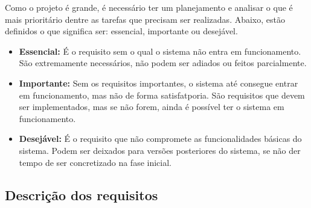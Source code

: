 \documentclass[12pt,a4paper]{report}
\begin{document}
Como o projeto é grande, é necessário ter um planejamento e analisar o que é mais prioritário dentre as tarefas que precisam ser realizadas. Abaixo, estão definidos o que significa ser: essencial, importante ou desejável. \\

\begin{itemize}
\item \textbf{Essencial:}
É o requisito sem o qual o sistema não entra em funcionamento.
São extremamente necessários, não podem ser adiados ou feitos parcialmente.

\item \textbf{Importante:}
Sem os requisitos importantes, o sistema até consegue entrar em funcionamento, mas não de forma satisfatporia. São requisitos que devem ser implementados, mas se não forem, ainda é possível ter o sistema em funcionamento.


\item \textbf{Desejável:}
É o requisito que não compromete as funcionalidades básicas do sistema. 
Podem ser deixados para versões posteriores do sistema, se não der tempo de ser concretizado na fase inicial.


\end{itemize}


\subsection{Descrição dos requisitos}
\end{document}
